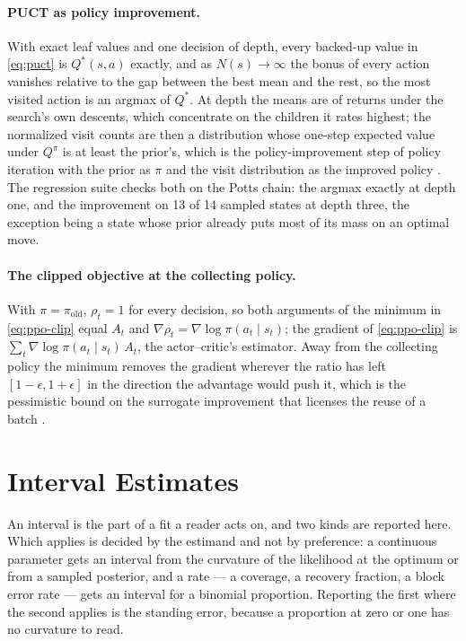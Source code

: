 \documentclass[11pt,a4paper]{article}
\begin{document}
\paragraph{PUCT as policy improvement.}
With exact leaf values and one decision of depth, every backed-up value in
\eqref{eq:puct} is $Q^*(s, a)$ exactly, and as $N(s) \to \infty$ the bonus
of every action vanishes relative to the gap between the best mean and the
rest, so the most visited action is an argmax of $Q^*$. At depth the means
are of returns under the search's own descents, which concentrate on the
children it rates highest; the normalized visit counts are then a
distribution whose one-step expected value under $Q^\pi$ is at least the
prior's, which is the policy-improvement step of policy iteration with the
prior as $\pi$ and the visit distribution as the improved policy
\citep{suttonbarto2018, silver2017}. The regression suite checks both on
the Potts chain: the argmax exactly at depth one, and the improvement on 13
of 14 sampled states at depth three, the exception being a state whose prior
already puts most of its mass on an optimal move.

\paragraph{The clipped objective at the collecting policy.}
With $\pi = \pi_{\mathrm{old}}$, $\rho_t = 1$ for every decision, so both
arguments of the minimum in \eqref{eq:ppo-clip} equal $A_t$ and
$\nabla \rho_t = \nabla \log \pi(a_t \mid s_t)$; the gradient of
\eqref{eq:ppo-clip} is $\sum_t \nabla \log \pi(a_t \mid s_t)\, A_t$, the
actor--critic's estimator. Away from the collecting policy the minimum
removes the gradient wherever the ratio has left $[1-\epsilon, 1+\epsilon]$
in the direction the advantage would push it, which is the pessimistic
bound on the surrogate improvement that licenses the reuse of a batch
\citep{schulman2017}.

\section{Interval Estimates}
\label{app:intervals}

An interval is the part of a fit a reader acts on, and two kinds are reported
here. Which applies is decided by the estimand and not by preference: a
continuous parameter gets an interval from the curvature of the likelihood at
the optimum or from a sampled posterior, and a rate --- a coverage, a
recovery fraction, a block error rate --- gets an interval for a binomial
proportion. Reporting the first where the second applies is the standing
error, because a proportion at zero or one has no curvature to read.
\end{document}
